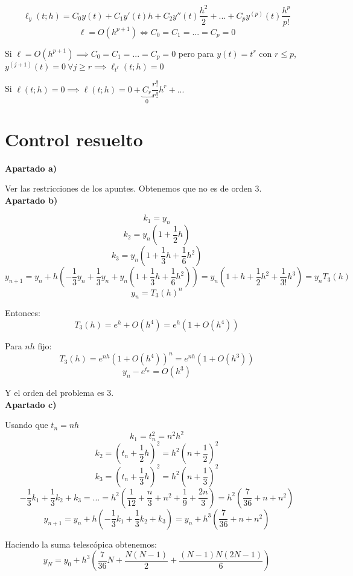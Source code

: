 \documentclass[openany]{book}
\begin{document}
    \setcounter{ex}{9}
    \begin{exercise}
        $$ \ell_{y}(t;h) = C_0 y(t) + C_1y'(t)h + C_2y''(t)\dfrac{h^2}{2} + ... + C_{p} y ^{(p)}(t) \dfrac{h^{p}}{p!} $$
        $$  \ell = O(h^{p+1}) \iff C_0 = C_1 = ... = C_{p} = 0 $$

        Si $  \ell = O(h^{p+1}) \implies C_0 = C_1 = ... = C_{p} = 0 $ pero para $ y(t) = t ^{r} $ con $  r\leq p $, $ y ^{(j+1)} (t)=0\ \forall j \geq r \implies \ell_{t^{r}}(t;h)=0$ 

        Si $ \ell(t;h)=0 \implies \ell(t;h) = 0 + \underbrace{C_{r}}_{0} \dfrac{r!}{r!}h^{r} + ...$
    \end{exercise}

    \chapter{Control resuelto}

    \textbf{Apartado a)}
    
    Ver las restricciones de los apuntes. Obtenemos que no es de orden 3.
    \\

    \textbf{Apartado b)}

    $$ k_1 = y_n $$
    $$ k_2 = y_n(1+\dfrac{1}{2}h) $$
    $$ k_3 = y_n(1+\dfrac{1}{3}h+\dfrac{1}{6}h^2) $$
    $$ y_{n+1} = y_n + h(-\dfrac{1}{3}y_n+\dfrac{1}{3}y_n + y_n(1+\dfrac{1}{3}h+\dfrac{1}{6}h^2)) = y_n(1+h+\dfrac{1}{2}h^2+\dfrac{1}{3!}h^3) = y_nT_3(h)$$
    $$ y_n = T_3(h)^{n} $$

    Entonces:
    $$ T_3(h) = e^{h}+ O(h^{4}) = e^{h}(1+O(h^{4}))$$
    
    Para $ nh $ fijo:
    $$ T_3(h) = e^{nh}(1+O(h^{4}))^{n} = e^{nh}(1+O(h^3)) $$
    $$ y_n-e^{t_n} = O(h^3) $$
    
    Y el orden del problema es 3.\\

    \textbf{Apartado c)}

    Usando que $ t_n = nh $
    $$ k_1 = t_n^2 = n^2h^2$$
    $$ k_2 = (t_n+\dfrac{1}{2}h)^2 = h^2(n+\dfrac{1}{2})^2 $$
    $$ k_3 = (t_n+\dfrac{1}{3}h)^2 = h^2(n+\dfrac{1}{3})^2$$
    $$ -\dfrac{1}{3}k_1 + \dfrac{1}{3}k_2 + k_3 = ... = h^2\left(\dfrac{1}{12}+\dfrac{n}{3}+n^2+\dfrac{1}{9}+\dfrac{2n}{3}\right) = h^2(\dfrac{7}{36}+n+n^2) $$
    $$ y_{n+1} = y_n + h\left(-\dfrac{1}{3}k_1+\dfrac{1}{3}k_2+k_3\right) = y_n + h^3\left(\dfrac{7}{36}+n+n^2\right) $$

    Haciendo la suma telescópica obtenemos:
    $$ y_{N} = y_0 + h^3(\dfrac{7}{36}N + \dfrac{N(N-1)}{2}+ \dfrac{(N-1)N(2N-1)}{6}) $$
\end{document}
